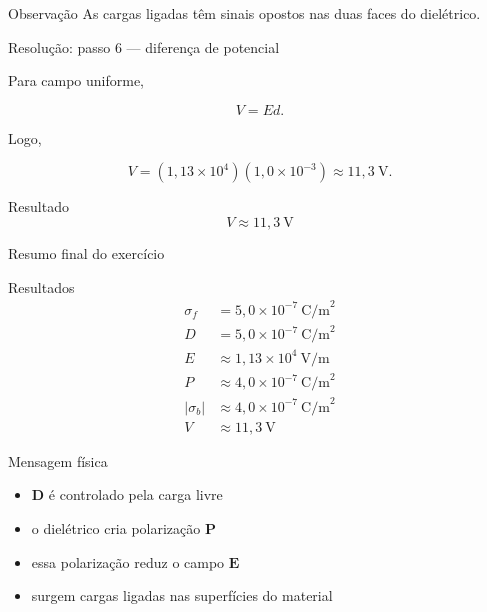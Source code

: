 \documentclass[aspectratio=169]{beamer}
\begin{document}
\begin{frame}

\begin{block}{Observação}
As cargas ligadas têm sinais opostos nas duas faces do dielétrico.
\end{block}

\end{frame}


\begin{frame}{Resolução: passo 6 --- diferença de potencial}

Para campo uniforme,

\begin{equation}
V = Ed.
\end{equation}

Logo,

\begin{equation}
V = (1{,}13\times 10^4)(1{,}0\times 10^{-3})
\approx 11{,}3\ \text{V}.
\end{equation}

\begin{alertblock}{Resultado}
\begin{equation}
V \approx 11{,}3\ \text{V}
\end{equation}
\end{alertblock}

\end{frame}


\begin{frame}{Resumo final do exercício}

\begin{block}{Resultados}
\begin{align}
\sigma_f &= 5,0\times 10^{-7}\ \text{C/m}^2 \\
D &= 5,0\times 10^{-7}\ \text{C/m}^2 \\
E &\approx 1{,}13\times 10^4\ \text{V/m} \\
P &\approx 4,0\times 10^{-7}\ \text{C/m}^2 \\
|\sigma_b| &\approx 4,0\times 10^{-7}\ \text{C/m}^2 \\
V &\approx 11,3\ \text{V}
\end{align}
\end{block}

\end{frame}


\begin{frame}

\begin{alertblock}{Mensagem física}
\begin{itemize}
\item \(\mathbf D\) é controlado pela carga livre
\item o dielétrico cria polarização \(\mathbf P\)
\item essa polarização reduz o campo \(\mathbf E\)
\item surgem cargas ligadas nas superfícies do material
\end{itemize}
\end{alertblock}

\end{frame}
\end{document}
